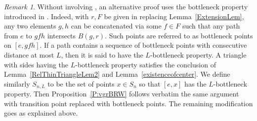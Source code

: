\documentclass{amsart}
\newcommand{\showcomments}{yes}
\newenvironment{comment}%
{\ifthenelse{\equal{\showcomments}{yes}}%
{\footnotemark
    \begin{lrbox}{\commentbox}
    \begin{minipage}[t]{1.25in}\raggedright\sffamily\upshape\tiny
    \footnotemark[\arabic{footnote}]}%
{\begin{lrbox}{\commentbox}}}%
{\ifthenelse{\equal{\showcomments}{yes}}%
{\end{minipage}\end{lrbox}\marginpar{\usebox{\commentbox}}}%
{\end{lrbox}}}
\theoremstyle{definition}
\theoremstyle{remark}
\newtheorem{rem}[thm]{Remark}
\newcommand{\ywy}[1]{{\color{red}{#1}}}
\begin{document}
\begin{rem}
Without involving \cite{PapasogluWhyte}, an alternative proof uses the bottleneck property  introduced in \cite{DussauleYang}.
Indeed, with $r, F$ be given in \cite[Lemma~5.4]{DussauleYang} replacing Lemma~\ref{ExtensionLem}, any two elements $g, h$ can be concatenated via some $f\in F$ such that any path from $e$ to $gfh$ intersects $B(g,r)$.
Such points are referred to as bottleneck points on $[e, gfh]$.
If a path contains a sequence of bottleneck points with consecutive distance at most $L$, then it is said to have the $L$-bottleneck property.
A triangle with sides having the $L$-bottleneck property satisfies the conclusion of Lemma~\ref{RelThinTriangleLem2} and Lemma~\ref{existenceofcenter}.
We define similarly  $S_{n,L}$ to be the set of points $x \in S_n$ so that $[e, x]$ has the $L$-bottleneck property.
Then  Proposition~\ref{P:vgrBRW} follows verbatim the same argument  with transition point replaced with bottleneck points.
The remaining modification goes as explained above.
\end{rem}

\end{document}

